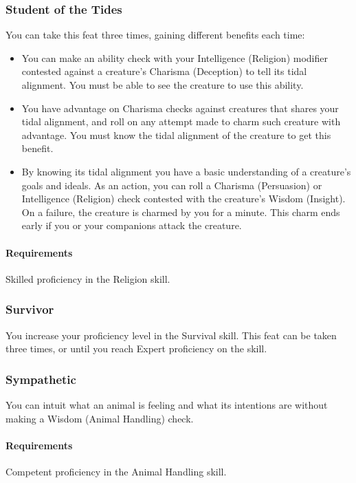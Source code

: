 \subsubsection{Student of the Tides} \label{feat::studentofthetides}
    You can take this feat three times, gaining different benefits each time:
    \begin{itemize}
        \item You can make an ability check with your Intelligence (Religion) modifier contested against a creature's Charisma (Deception) to tell its tidal alignment.
        You must be able to see the creature to use this ability.
        \item You have advantage on Charisma checks against creatures that shares your tidal alignment, and roll on any attempt made to charm such creature with advantage.
        You must know the tidal alignment of the creature to get this benefit.
        \item By knowing its tidal alignment you have a basic understanding of a creature's goals and ideals.
        As an action, you can roll a Charisma (Persuasion) or Intelligence (Religion) check contested with the creature's Wisdom (Insight).
        On a failure, the creature is charmed by you for a minute.
        This charm ends early if you or your companions attack the creature.
    \end{itemize}
    \paragraph{Requirements} Skilled proficiency in the Religion skill.
\subsubsection{Survivor} \label{feat::survivor}
    You increase your proficiency level in the Survival skill.
    This feat can be taken three times, or until you reach Expert proficiency on the skill.
\subsubsection{Sympathetic} \label{feat::sympathetic}
    You can intuit what an animal is feeling and what its intentions are without making a Wisdom (Animal Handling) check.
    \paragraph{Requirements} Competent proficiency in the Animal Handling skill.
